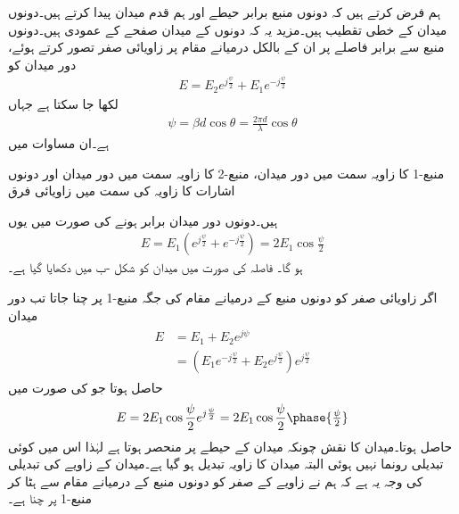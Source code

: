 ہم فرض کرتے ہیں کہ دونوں منبع برابر حیطے اور ہم قدم میدان پیدا کرتے ہیں۔دونوں میدان کے خطی تقطیب ہیں۔مزید یہ کہ دونوں کے  میدان صفحے کے عمودی ہیں۔دونوں منبع سے برابر فاصلے پر ان کے بالکل درمیانے مقام پر زاویائی صفر تصور کرتے ہوئے، دور میدان کو
\begin{align}
E=E_2 e^{j\frac{\psi}{2}} + E_1 e^{-j \frac{\psi}{2}}
\end{align}
لکھا جا سکتا ہے جہاں
\begin{align}
\psi=\beta d \cos \theta=\frac{2\pi d}{\lambda}\cos \theta
\end{align}
ہے۔ان مساوات میں 
\begin{description}
 منبع-1 کا زاویہ  سمت میں دور میدان،
 منبع-2 کا زاویہ  سمت میں دور میدان اور
 دونوں اشارات کا زاویہ  کی سمت میں زاویائی فرق
\end{description}
ہیں۔دونوں دور میدان برابر  ہونے کی صورت میں یوں
\begin{align}\label{مساوات_اینٹینا_دو_نقطہ_الف}
E=E_1 \left(e^{j\frac{\psi}{2}} + e^{-j \frac{\psi}{2}} \right)=2 E_1 \cos \frac{\psi}{2}
\end{align}
ہو گا۔ فاصلہ   کی صورت میں میدان کو شکل -ب میں دکھایا گیا ہے۔

اگر زاویائی صفر کو دونوں منبع کے درمیانے مقام کی جگہ منبع-1 پر چنا جاتا تب دور میدان
\begin{gather}
\begin{aligned}\label{مساوات_اینٹینا_دو_رکنی_قطار}
E&=E_1+E_2 e^{j \psi}\\
&=\left(E_1 e^{-j\frac{\psi}{2}}+E_2 e^{j \frac{\psi}{2}}\right) e^{j\frac{\psi}{2}}
\end{aligned}
\end{gather}
حاصل ہوتا جو  کی صورت میں 
\begin{align}\label{مساوات_اینٹینا_دو_نقطہ_ب}
E=2 E_1 \cos \frac{\psi}{2} e^{j\frac{\psi}{2}}=2 E_1 \cos \frac{\psi}{2} \phase{\tfrac{\psi}{2}}
\end{align}
حاصل ہوتا۔میدان کا نقش  چونکہ میدان کے حیطے پر منحصر ہوتا ہے لہٰذا اس میں کوئی تبدیلی رونما نہیں ہوئی البتہ میدان کا زاویہ تبدیل ہو گیا ہے۔میدان کے زاویے کی تبدیلی کی وجہ یہ ہے کہ ہم نے زاویے کے صفر کو دونوں منبع کے درمیانے مقام سے ہٹا کر منبع-1 پر چنا ہے۔

